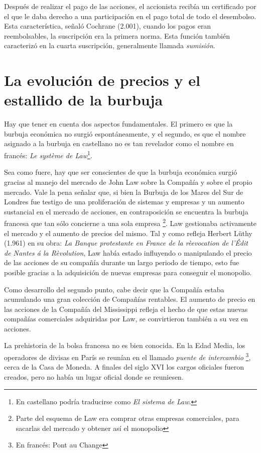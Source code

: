 Después de realizar el pago de las acciones, el accionista recibía un certificado por el que le daba derecho a una participación en el pago total de todo el desembolso. Esta característica, señaló Cochrane (2.001), cuando los pagos eran reembolsables, la suscripción era la primera norma. Esta función también caracterizó en la cuarta suscripción, generalmente llamada \emph{sumisión}. 


\section{La evolución de precios y el estallido de la burbuja}  
Hay que tener en cuenta dos aspectos fundamentales. El primero es que la burbuja económica no surgió espontáneamente, y el segundo, es que el nombre asignado a la burbuja en castellano no es tan revelador como el nombre en francés: \emph{Le système de Law}\footnote{En castellano podría traducirse como \emph{El sistema de Law}.}.

Sea como fuere, hay que ser conscientes de que la burbuja económica surgió gracias al manejo del mercado de John Law sobre la Compañía y sobre el propio mercado. Vale la pena señalar que, si bien la Burbuja de los Mares del Sur de Londres fue testigo de una proliferación de sistemas y empresas y un aumento sustancial en el mercado de acciones, en contraposición se encuentra la burbuja francesa que tan sólo concierne a una sola empresa \footnote{Parte del esquema de Law era comprar otras empresas comerciales, para sacarlas del mercado y obtener así el monopolio}. Law gestionaba activamente el mercado y el aumento de precios del mismo. Tal y como refleja Herbert Lüthy (1.961) en su obra: \emph{La Banque protestante en France de la rèevocation de l'Édit de Nantes á la Rèvolution}, Law había estado influyendo o manipulando el precio de las acciones de su compañía durante un largo periodo de tiempo, esto fue posible gracias a la adquisición de nuevas empresas para conseguir el monopolio.

Como desarrollo del segundo punto, cabe decir que la Compañía estaba acumulando una gran colección de Compañías rentables. El aumento de precio en las acciones de la Compañía del Mississippi refleja el hecho de que estas nuevas compañías comerciales adquiridas por Law, se convirtieron también a su vez en acciones. 

La prehistoria de la bolsa francesa no es bien conocida. En la Edad Media, los operadores de divisas en París se reunían en el llamado \emph{puente de intercambio} \footnote{En francés: Pont au Change}, cerca de la Casa de Moneda. A finales del siglo XVI los cargos oficiales fueron creados, pero no había un lugar oficial donde se reuniesen.

